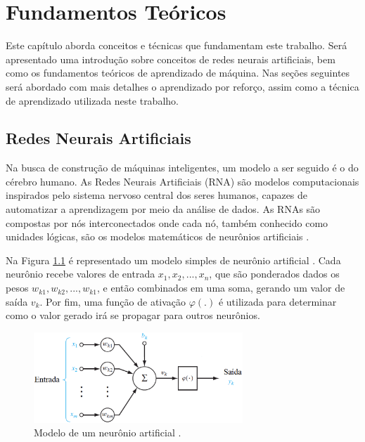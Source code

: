 \chapter{Fundamentos Teóricos}
\label{cap:fundamento}
Este capítulo aborda conceitos e técnicas que fundamentam este trabalho. Será apresentado uma introdução sobre conceitos de redes neurais artificiais, bem como os fundamentos teóricos de aprendizado de máquina. Nas seções seguintes será abordado com mais detalhes o aprendizado por reforço, assim como a técnica de aprendizado utilizada neste trabalho. 

\section{Redes Neurais Artificiais}

Na busca de construção de máquinas inteligentes, um modelo a ser seguido é o do cérebro humano. As Redes Neurais Artificiais (RNA) são modelos computacionais inspirados pelo sistema nervoso central dos seres humanos, capazes de automatizar a aprendizagem por meio da análise de dados. As RNAs são compostas por nós interconectados onde cada nó, também conhecido como unidades lógicas, são os modelos matemáticos de neurônios artificiais \cite{gama11}. 

Na Figura \ref{fig:neuronio} é representado um modelo simples de neurônio artificial \cite{haylin99}. Cada neurônio recebe valores de entrada $x_{1}, x_{2}, ..., x_{n} $, que são ponderados dados os pesos $w_{k1}, w_{k2}, ..., w_{k1}$, e então combinados em uma soma, gerando um valor de saída $v_{k}$.  Por fim, uma função de ativação $\varphi(.)$ é utilizada para determinar como o valor gerado irá se propagar para outros neurônios. 

\begin{figure}[hb]
 \centering
  \includegraphics[width=0.7\textwidth]{./fig/neuronio}
 \caption{Modelo de um neurônio artificial \cite{santamaria2018}.}
 \label{fig:neuronio}
\end{figure}

